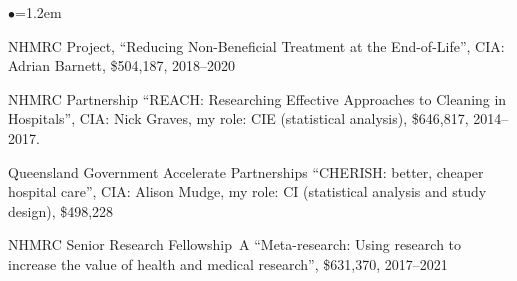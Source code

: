 \documentclass[a4paper,11pt]{article}
\renewcommand{\labelitemi}{$\bullet$}
\begin{document}
\begin{raggedright}
\begin{list}{\labelitemi}{\leftmargin=1.2em}
\item NHMRC Project, ``Reducing Non-Beneficial Treatment at the End-of-Life'', CIA: Adrian Barnett, \$504,187, 2018--2020

\item NHMRC Partnership ``REACH: Researching Effective Approaches to Cleaning in Hospitals'', CIA: Nick Graves, my role: CIE (statistical analysis), \$646,817, 2014--2017.

\item Queensland Government Accelerate Partnerships ``CHERISH: better, cheaper hospital care'', CIA: Alison Mudge, my role: CI (statistical analysis and study design), \$498,228 %

\item NHMRC Senior Research Fellowship~A ``Meta-research: Using research to increase the value of health and medical research'', \$631,370, 2017--2021



\end{list}


\end{raggedright}
\end{document}
